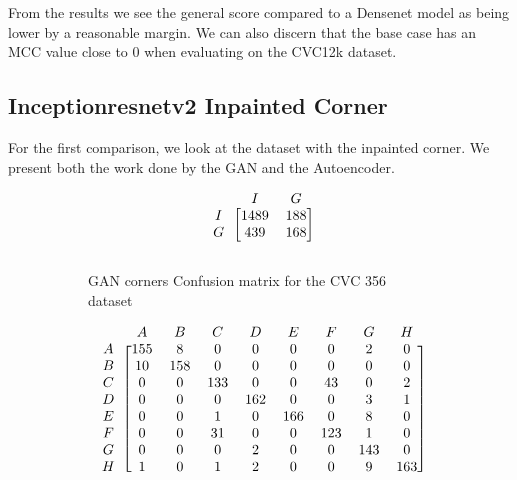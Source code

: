 From the results we see the general score compared to a Densenet model as being lower by a reasonable margin. We can also discern that the base case has an MCC value close to 0 when evaluating on the CVC12k dataset.


\subsection{Inceptionresnetv2 Inpainted Corner}

For the first comparison, we look at the dataset with the inpainted corner. We present both the work done by the GAN and the Autoencoder. 

\begin{figure}[h]
\myfontsize
\caption*{\footnotesize \textmd{ \textbf{A}:{dyed-lifted-polyps} , \textbf{B}:{dyed-resection-margins} , \textbf{C}:{esophagitis} , \textbf{D}:{normal-cecum} , \textbf{E}:{normal-pylorus} , \textbf{F}:{normal-z-line} , \textbf{G}:{polyps} , \textbf{H}:{ulcerative-colitis} , \textbf{I}:{non-polyp}}}

\begin{subfigure}[b]{0.25\textwidth}
     
\[
\begin{blockarray}{ccc}
& I & G  \\
\begin{block}{c[cc]}
        I&1489 &  188\\
        G& 439 &  168\\
\end{block}
\end{blockarray}
 \]         

\caption{GAN corners Confusion matrix for the CVC 356 dataset}
\label{mat:cvc356_CM_IRV2_GAN_CORNER}
\end{subfigure}
\begin{subfigure}[b]{0.49\textwidth}  
\scriptsize     
\[
\begin{blockarray}{ccccccccc}
& A & B & C & D & E & F & G & H \\
\begin{block}{c[cccccccc]}
A&155 & 8 & 0 & 0 & 0 & 0 & 2 & 0\\
B& 10 & 158 & 0 & 0 & 0 & 0 & 0 & 0\\
C&  0 & 0 & 133 & 0 & 0 & 43 & 0 & 2\\
D&  0 & 0 & 0 & 162 & 0 & 0 & 3 & 1\\
E&  0 & 0 & 1 & 0 & 166 & 0 & 8 & 0\\
F&  0 & 0 & 31 & 0 & 0 & 123 & 1 & 0\\
G&  0 & 0 & 0 & 2 & 0 & 0 & 143 & 0\\
H&  1 & 0 & 1 & 2 & 0 & 0 & 9 & 163\\
\end{block}
\end{blockarray}
 \]        
        

\end{subfigure}
\end{figure}
